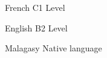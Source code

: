 

\begin{cvskills}

  \cvskill
    {French} %
    {C1 Level} %

  \cvskill
    {English} %
    {B2 Level} %

  \cvskill
    {Malagasy} %
    {Native language} %

\end{cvskills}
